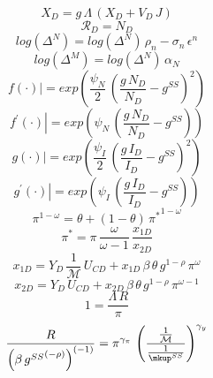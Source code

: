 \documentclass[10pt,a4paper]{article}
\begin{document}
\begin{dmath}
{X_D}={g}\, {\Lambda}\, \left({X_D}+{V_D}\, {J}\right)
\end{dmath}
\begin{dmath}
{\mathcal{R}_{D}}={N_D}
\end{dmath}
\begin{dmath}
log\left({\Delta^N}\right)=log\left({\Delta^N}\right)\, {\rho}_n-{\sigma}_n\, {\epsilon}^n
\end{dmath}
\begin{dmath}
log\left({\Delta^M}\right)=log\left({\Delta^N}\right)\, \alpha_N
\end{dmath}
\begin{dmath}
{\left.       f\left( \cdot \right)            \right|}=exp\left(\frac{{\psi_N}}{2}\, \left(\frac{{g}\, {N_D}}{{N_D}}-{g^{SS}}\right)^{2}\right)
\end{dmath}
\begin{dmath}
{\left.       f^{\prime}\left( \cdot \right)   \right|}=exp\left({\psi_N}\, \left(\frac{{g}\, {N_D}}{{N_D}}-{g^{SS}}\right)\right)
\end{dmath}
\begin{dmath}
{\left.       g\left( \cdot \right)            \right|}=exp\left(\frac{{\psi_I}}{2}\, \left(\frac{{g}\, {I_D}}{{I_D}}-{g^{SS}}\right)^{2}\right)
\end{dmath}
\begin{dmath}
{\left.       g^{\prime}\left( \cdot \right)   \right|}=exp\left({\psi_I}\, \left(\frac{{g}\, {I_D}}{{I_D}}-{g^{SS}}\right)\right)
\end{dmath}
\begin{dmath}
{\pi}^{1-{\omega}}={\theta}+\left(1-{\theta}\right)\, {\pi^*}^{1-{\omega}}
\end{dmath}
\begin{dmath}
{\pi^*}={\pi}\, \frac{{\omega}}{{\omega}-1}\, \frac{{x_{1D}}}{{x_{2D}}}
\end{dmath}
\begin{dmath}
{x_{1D}}={Y_D}\, \frac{1}{{\mathcal{M}}}\, {U_{CD}}+{x_{1D}}\, \beta\, {\theta}\, {g}^{1-\rho}\, {\pi}^{{\omega}}
\end{dmath}
\begin{dmath}
{x_{2D}}={Y_D}\, {U_{CD}}+{x_{2D}}\, \beta\, {\theta}\, {g}^{1-\rho}\, {\pi}^{{\omega}-1}
\end{dmath}
\begin{dmath}
1=\frac{{\Lambda}\, {R}}{{\pi}}
\end{dmath}
\begin{dmath}
\frac{{R}}{\left(\beta\, {g^{SS}}^{\left(-\rho\right)}\right)^{\left(-1\right)}}={\pi}^{{{\gamma}_{\pi}}}\, \left(\frac{\frac{1}{{\mathcal{M}}}}{\frac{1}{{\mkup^{SS}}}}\right)^{{{\gamma}_{y}}}
\end{dmath}
\end{document}
